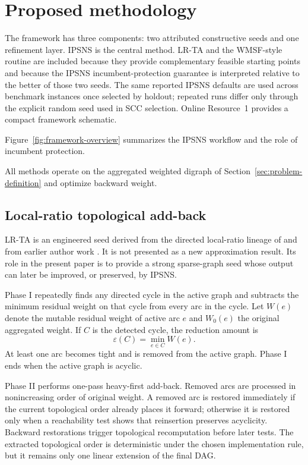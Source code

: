\section{Proposed methodology}
\label{sec:algorithmic-framework}

The framework has three components: two attributed constructive seeds and one refinement layer. IPSNS is the central method. LR-TA and the WMSF-style routine are included because they provide complementary feasible starting points and because the IPSNS incumbent-protection guarantee is interpreted relative to the better of those two seeds. The same reported IPSNS defaults are used across benchmark instances once selected by holdout; repeated runs differ only through the explicit random seed used in SCC selection. Online Resource~1 provides a compact framework schematic.

Figure~\ref{fig:framework-overview} summarizes the IPSNS workflow and the role of incumbent protection.



All methods operate on the aggregated weighted digraph of Section~\ref{sec:problem-definition} and optimize backward weight.

\subsection{Local-ratio topological add-back}
\label{subsec:lrta}

LR-TA is an engineered seed derived from the directed local-ratio lineage of \cite{DF03} and from earlier author work \cite{VahidiKoutis2024arxiv}. It is not presented as a new approximation result. Its role in the present paper is to provide a strong sparse-graph seed whose output can later be improved, or preserved, by IPSNS.

Phase I repeatedly finds any directed cycle in the active graph and subtracts the minimum residual weight on that cycle from every arc in the cycle. Let \(W(e)\) denote the mutable residual weight of active arc \(e\) and \(W_0(e)\) the original aggregated weight. If \(C\) is the detected cycle, the reduction amount is
\begin{equation}
    \varepsilon(C)=\min_{e\in C} W(e).
    \label{eq:lrta-epsilon}
\end{equation}
At least one arc becomes tight and is removed from the active graph. Phase I ends when the active graph is acyclic.

Phase II performs one-pass heavy-first add-back. Removed arcs are processed in nonincreasing order of original weight. A removed arc is restored immediately if the current topological order already places it forward; otherwise it is restored only when a reachability test shows that reinsertion preserves acyclicity. Backward restorations trigger topological recomputation before later tests. The extracted topological order is deterministic under the chosen implementation rule, but it remains only one linear extension of the final DAG.

